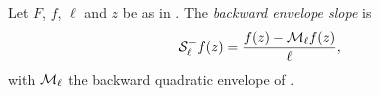 \begin{definition}
Let $F$, $f$, $\ell$ and $z$ be as in . The \emph{backward
envelope slope} is
\[
  \mathcal{S}_\ell^-f(z)=\frac{f(z)-\mathcal{M}_\ell f(z)}{\ell},
\]
with $\mathcal{M}_\ell$ the backward quadratic envelope of .
\end{definition}
